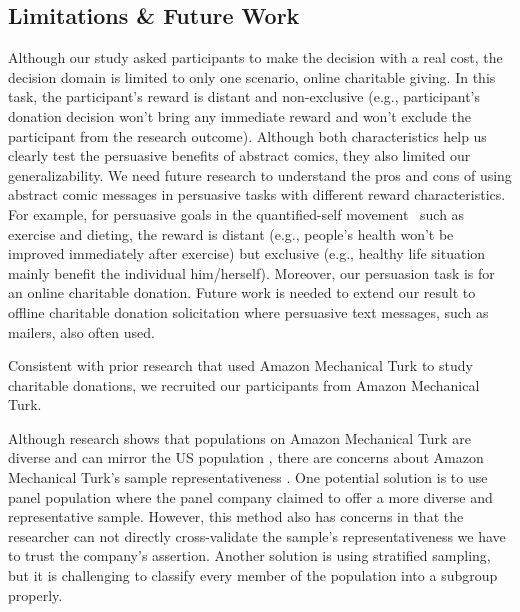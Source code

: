 \subsection{Limitations \& Future Work}
\begin{description}[leftmargin=\parindent,topsep=0pt,partopsep=3pt,parsep=0pt,itemsep=3pt, listparindent=\parindent]
\item[Distant and Non-exclusive Task:]  Although our study asked participants to make the decision with a real cost, the decision domain is limited to only one scenario, online charitable giving. In this task, the participant's reward is distant and non-exclusive (e.g., participant's donation decision won't bring any immediate reward and won't exclude the participant from the research outcome). Although both characteristics help us clearly test the persuasive benefits of abstract comics, they also limited our generalizability. We need future research to understand the pros and cons of using abstract comic messages in persuasive tasks with different reward characteristics. For example, for persuasive goals in the quantified-self movement~\cite{Epstein2014,Choe2014} such as exercise and dieting, the reward is distant (e.g., people's health won't be improved immediately after exercise) but exclusive (e.g., healthy life situation mainly benefit the individual him/herself). Moreover, our persuasion task is for an online charitable donation. Future work is needed to extend our result to offline charitable donation solicitation where persuasive text messages, such as mailers, also often used. 

\item[Study on Amazon Mechanical Turk:] Consistent with prior research \cite{lee2013does,saunders2016no,sussman2015framing,arechar2017turking,branas2018gender} that used Amazon Mechanical Turk to study charitable donations, we recruited our participants from Amazon Mechanical Turk.


Although research shows that populations on Amazon Mechanical Turk are diverse and can mirror the US population \cite{buhrmester2011amazon,behrend2011viability,berinsky2012evaluating}, there are concerns about Amazon Mechanical Turk's sample representativeness \cite{landers2015inconvenient,paolacci2010running}. One potential solution is to use panel population where the panel company claimed to offer a more diverse and representative sample.
However, this method also has concerns in that the researcher can not directly cross-validate the sample's representativeness we have to trust the company's assertion. Another solution is using stratified sampling, but it is challenging to classify every member of the population into a subgroup properly. 


\end{description}

